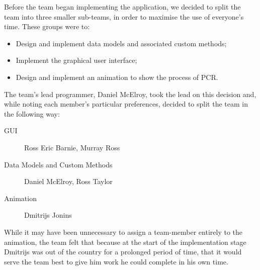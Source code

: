 Before the team began implementing the application, we decided to
split the team into three smaller sub-teams, in order to maximise the
use of everyone's time.
These groups were to:
\begin{itemize}
\item Design and implement data models and associated custom methods;
\item Implement the graphical user interface;
\item Design and implement an animation to show the process of PCR.
\end{itemize}

The team's lead programmer, Daniel McElroy, took the lead on this
decision and, while noting each member's particular preferences,
decided to split the team in the following way:
\begin{description}
\item[GUI]{Ross Eric Barnie, Murray Ross}
\item[Data Models and Custom Methods] {Daniel McElroy, Ross Taylor}
\item[Animation] {Dmitrijs Jonins}
\end{description}

While it may have been unnecessary to assign a team-member entirely to
the animation, the team felt that because at the start of the
implementation stage Dmitrijs was out of the country for a prolonged
period of time, that it would serve the team best to give him work he
could complete in his own time.